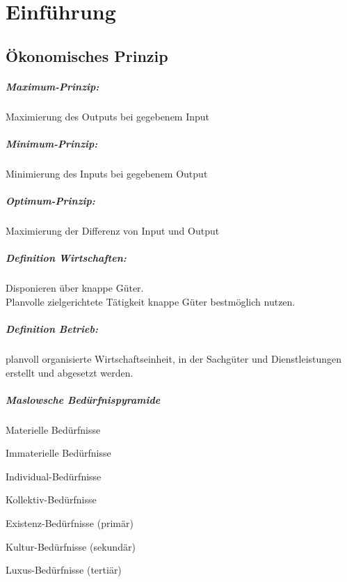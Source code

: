 \chapter{Einführung}
\section{Ökonomisches Prinzip}
\paragraph{Maximum-Prinzip:} Maximierung des Outputs bei gegebenem Input
\paragraph{Minimum-Prinzip:} Minimierung des Inputs bei gegebenem Output
\paragraph{Optimum-Prinzip:} Maximierung der Differenz von Input und Output

\paragraph{Definition Wirtschaften:} Disponieren über knappe Güter.\\
Planvolle zielgerichtete Tätigkeit knappe Güter bestmöglich nutzen.

\paragraph{Definition Betrieb:} planvoll organisierte Wirtschaftseinheit, in der Sachgüter und Dienstleistungen erstellt und abgesetzt werden.

\paragraph{Maslowsche Bedürfnispyramide}
\begin{compactitem}
	\item Materielle Bedürfnisse
	\item Immaterielle Bedürfnisse
\end{compactitem}
\begin{compactitem}
	\item Individual-Bedürfnisse
	\item Kollektiv-Bedürfnisse
\end{compactitem}
\begin{compactitem}
	\item Existenz-Bedürfnisse (primär)
	\item Kultur-Bedürfnisse (sekundär)
	\item Luxus-Bedürfnisse (tertiär)
\end{compactitem}

